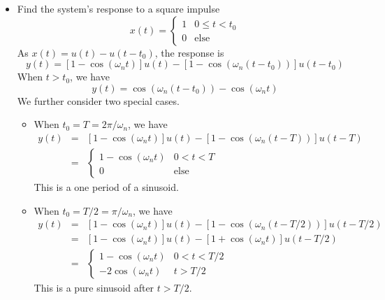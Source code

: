 \documentclass{article}
\begin{document}
\begin{itemize}
\item Find the system's response to a square impulse 
  \begin{equation}
    x(t)=\left\{ \begin{array}{ll}1 & 0\le t< t_0 \\0 & \mbox{else} 
    \end{array} \right. 
  \end{equation}
  As $x(t)=u(t)-u(t-t_0)$, the response is
  \begin{equation}
    y(t)=[1-\cos(\omega_nt)]u(t)-[1-\cos(\omega_n(t-t_0))]u(t-t_0) 
  \end{equation}
  When $t>t_0$, we have
  \begin{equation}
    y(t)=\cos(\omega_n(t-t_0))-\cos(\omega_nt) 
  \end{equation}
  We further consider two special cases. 
  \begin{itemize}
  \item When $t_0=T=2\pi/\omega_n$, we have 
    \begin{eqnarray}
      y(t)&=&[1-\cos(\omega_nt)]u(t)-[1-\cos(\omega_n(t-T))]u(t-T)
      \nonumber \\
      &=&\left\{\begin{array}{cl} 1-\cos(\omega_nt) & 0<t<T \\ 0 & \mbox{else}
      \end{array} \right. 
    \end{eqnarray}
    This is a one period of a sinusoid.
  \item When $t_0=T/2=\pi/\omega_n$, we have
    \begin{eqnarray}
      y(t)&=&[1-\cos(\omega_nt)]u(t)-[1-\cos(\omega_n(t-T/2))]u(t-T/2)
      \nonumber \\
      &=&[1-\cos(\omega_nt)]u(t)-[1+\cos(\omega_nt)]u(t-T/2)
      \nonumber \\
      &=&\left\{\begin{array}{cl}1-\cos(\omega_nt) & 0<t<T/2 \\
      -2\cos(\omega_nt) & t>T/2 \end{array} \right.
    \end{eqnarray}
    This is a pure sinusoid after $t>T/2$.
  \end{itemize}


\end{itemize}
\end{document}
